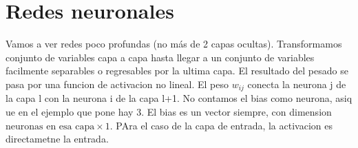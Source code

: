 \chapter{Redes neuronales}\label{Chapter7} 

Vamos a ver redes poco profundas (no más de 2 capas ocultas). Transformamos conjunto de variables capa a capa hasta llegar a un conjunto de variables facilmente separables o regresables por la ultima capa. El resultado del pesado se pasa por una funcion de activacion no lineal. El peso $w_{ij}$ conecta la neurona j de la capa l con la neurona i de la capa l+1. No contamos el bias como neurona, asiq ue en el ejemplo que pone hay 3. El bias es un vector siempre, con dimension $\text{neuronas en esa capa} \times 1$. PAra el caso de la capa de entrada, la activacion es directametne la entrada. 